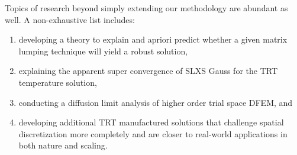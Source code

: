 Topics of research beyond simply extending our methodology are abundant as well.
A non-exhaustive list includes:
\begin{enumerate}
\item developing a theory to explain and apriori predict whether a given matrix lumping technique will yield a robust solution,
\item explaining the apparent super convergence of SLXS Gauss for the TRT temperature solution, 
\item conducting a diffusion limit analysis of higher order trial space DFEM, and
\item developing additional TRT manufactured solutions that challenge spatial discretization more completely and are closer to real-world applications in both nature and scaling.
\end{enumerate}
